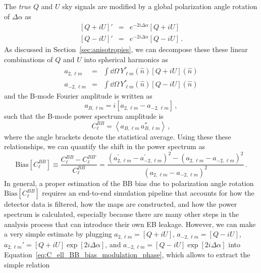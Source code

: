 The \textit{true} $Q$ and $U$ sky signals are modified by a global polarization angle rotation of $\Delta \alpha$ as
\begin{eqnarray}
    \left[ Q + i U \right]' & = & e^{-2 i \Delta \alpha} \left[ Q + i U \right] \nonumber \\
    \left[ Q - i U \right]' & = & e^{-2 i \Delta \alpha} \left[ Q - i U \right] \, .
\end{eqnarray}
As discussed in Section~\ref{sec:anisotropies}, we can decompose these these linear combinations of $Q$ and $U$ into spherical harmonics as
\begin{eqnarray}
    a_{2, \ell m} & = & \int \dd \Omega\,  Y^{*}_{\ell m}\left( \hat{n} \right) \left[ Q + i U \right]\left( \hat{n} \right) \nonumber \\
    a_{-2, \ell m} & = & \int \dd \Omega \, Y^{*}_{\ell m}\left( \hat{n} \right) \left[ Q - i U \right]\left( \hat{n} \right)
    \label{eq:alm_QU}
\end{eqnarray}
and the B-mode Fourier amplitude is written as
\begin{equation}
    a_{B, \ell m} = i \left[ a_{2, \ell m} - a_{-2, \ell m} \right] \, ,
    \label{eq:alm_B}
\end{equation}
such that the B-mode power spectrum amplitude is
\begin{equation}
    C_{\ell}^{BB} = \left< a_{B, \ell m} \, a_{B, \ell m}^{*} \right> \, ,
\end{equation}
where the angle brackets denote the statistical average. Using these these relationships, we can quantify the shift in the power spectrum as
\begin{equation}
    \mathrm{Bias}\left[ C_{\ell}^{BB} \right] \equiv \frac{C_{\ell}^{BB} - C_{\ell}^{BB \prime}}{C_{\ell}^{BB}} = \frac{\left( a_{2, \ell m}^{\prime} - a_{-2, \ell m}^{\prime} \right)^{2} - \left( a_{2, \ell m} - a_{-2, \ell m} \right)^{2}}{\left( a_{2, \ell m} - a_{-2, \ell m} \right)^{2}} \, .
    \label{eq:C_ell_BB_bias_modulation_phase}
\end{equation}
In general, a proper estimation of the BB bias due to polarization angle rotation $\mathrm{Bias}\left[ C_{\ell}^{BB} \right]$ requires an end-to-end simulation pipeline that accounts for how the detector data is filtered, how the maps are constructed, and how the power spectrum is calculated, especially because there are many other steps in the analysis process that can introduce their own EB leakage. However, we can make a very simple estimate by plugging $a_{2, \ell m} = [ Q + i U ]$, $a_{-2, \ell m} = [ Q - i U ]$, $a_{2, \ell m}' = [ Q + i U ] \exp[2 i \Delta \alpha]$, and $a_{-2, \ell m} = [ Q - i U ] \exp[2 i \Delta \alpha]$ into Equation~\ref{eq:C_ell_BB_bias_modulation_phase}, which allows to extract the simple relation
